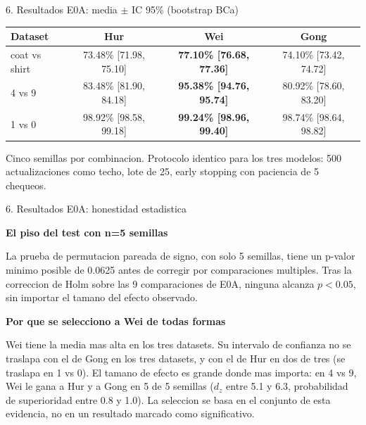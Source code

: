 \documentclass[aspectratio=169]{beamer}
\newcommand{\bmheading}[2]{\textbf{\color{#1}#2}\par\smallskip}
\newcommand{\bandedtable}{\rowcolors{2}{white}{bmRowAlt}}
\newcommand{\winner}[1]{\textbf{#1}}
\begin{document}
\begin{frame}{6. Resultados E0A: media $\pm$ IC 95\% (bootstrap BCa)}
  \footnotesize
  \bandedtable
  \begin{tabular}{@{}lccc@{}}
    \toprule
    \textbf{Dataset} & \textbf{Hur} & \textbf{Wei} & \textbf{Gong} \\
    \midrule
    coat vs shirt & 73.48\% [71.98, 75.10] & \winner{77.10\% [76.68, 77.36]} & 74.10\% [73.42, 74.72] \\
    4 vs 9        & 83.48\% [81.90, 84.18] & \winner{95.38\% [94.76, 95.74]} & 80.92\% [78.60, 83.20] \\
    1 vs 0        & 98.92\% [98.58, 99.18] & \winner{99.24\% [98.96, 99.40]} & 98.74\% [98.64, 98.82] \\
    \bottomrule
  \end{tabular}

  \vspace{10pt}
  Cinco semillas por combinacion. Protocolo identico para los tres modelos: 500
  actualizaciones como techo, lote de 25, early stopping con paciencia de 5
  chequeos.
\end{frame}

\begin{frame}{6. Resultados E0A: honestidad estadistica}
  \begin{amberbox}
    \bmheading{bmAmber}{El piso del test con n=5 semillas}
    La prueba de permutacion pareada de signo, con solo 5 semillas, tiene un
    p-valor minimo posible de 0.0625 antes de corregir por comparaciones
    multiples. Tras la correccion de Holm sobre las 9 comparaciones de E0A,
    ninguna alcanza $p<0.05$, sin importar el tamano del efecto observado.
  \end{amberbox}

  \vspace{8pt}

  \begin{greenbox}
    \bmheading{bmGreen}{Por que se selecciono a Wei de todas formas}
    Wei tiene la media mas alta en los tres datasets. Su intervalo de
    confianza no se traslapa con el de Gong en los tres datasets, y con el de
    Hur en dos de tres (se traslapa en 1 vs 0). El tamano de efecto es grande
    donde mas importa: en 4 vs 9, Wei le gana a Hur y a Gong en 5 de 5
    semillas ($d_z$ entre 5.1 y 6.3, probabilidad de superioridad entre 0.8 y
    1.0). La seleccion se basa en el conjunto de esta evidencia, no en un
    resultado marcado como significativo.
  \end{greenbox}
\end{frame}
\end{document}
